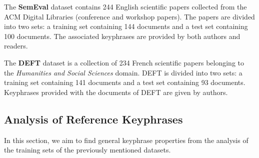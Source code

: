     The \textbf{SemEval} dataset \cite{kim2010semeval} contains 244 English
    scientific papers collected from the ACM Digital Libraries (conference and
    workshop papers). The papers are divided into two sets: a training set
    containing 144 documents and a test set containing 100 documents. The
    associated keyphrases are provided by both authors and readers.

    The \textbf{DEFT} dataset \cite{paroubek2012deft} is a collection of 234
    French scientific papers belonging to the \textit{Humanities and Social
    Sciences} domain. DEFT is divided into two sets: a training set containing
    141 documents and a test set containing 93 documents. Keyphrases provided
    with the documents of DEFT are given by authors.

  \subsection{Analysis of Reference Keyphrases}
  \label{subsec:keyphrase_analysis}
    In this section, we aim to find general keyphrase properties from the
    analysis of the training sets of the previously mentioned datasets.

